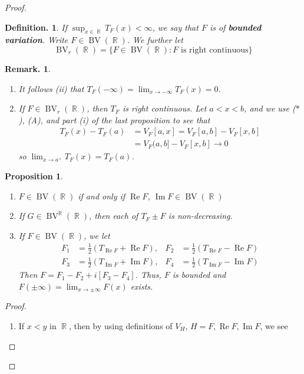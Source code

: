 \documentclass[12pt, a4paper]{memoir}
\DeclareMathOperator{\R}{{\mathbb{R}}}
\newtheorem{proposition}[theorem]{Proposition}
\theoremstyle{nonumberplain}
\newtheorem{definition}{Definition.}
\newtheorem{remark}{Remark.}
\newtheorem{proof}{Proof}
\renewcommand{\Re}{\ensuremath{\operatorname{Re}}}
\renewcommand{\Im}{\ensuremath{\operatorname{Im}}}
\DeclareMathOperator{\BV}{BV}
\begin{document}
\begin{proof}
\begin{definition}
    If $\sup_{x\in\R}T_F(x)<\infty$, we say that $F$ is of \textbf{bounded variation}.
    Write $F\in\BV(\R)$.
    We further let
    \begin{equation*}
        \BV_r(\R)=\{F\in \BV(\R):F\text{ is right continuous}\}
    \end{equation*}
\end{definition}
\begin{remark}
    \begin{enumerate}[nl,r]
        \item It follows (ii) that $T_F(-\infty)=\lim_{x\to -\infty}T_F(x)=0$.
        \item If $F\in \BV_r(\R)$, then $T_F$ is right continuous.
            Let $a<x<b$, and we use ($*$), (A), and part (i) of the last proposition to see that
            \begin{align*}
                T_F(x)-T_F(a) &= V_F[a,x]=V_F[a,b]-V_F[x,b]\\
                              &= V_F(a,b]-V_F[x,b]\to 0
            \end{align*}
            so $\lim_{x\to a^+}T_F(x)=T_F(a)$.
    \end{enumerate}
\end{remark}
\begin{proposition}
    \begin{enumerate}[nl,r]
        \item $F\in\BV(\R)$ if and only if $\Re F$, $\Im F\in\BV(\R)$
        \item If $G\in\BV^{\R}(\R)$, then each of $T_F\pm F$ is non-decreasing.
        \item If $F\in\BV(\R)$, we let
            \begin{align*}
                F_1 &= \frac{1}{2}\left(T_{\Re F}+ \Re F\right), & F_2&=\frac{1}{2}\left(T_{\Re F}-\Re F\right)\\
                F_3 &= \frac{1}{2}\left(T_{\Im F}+ \Im F\right), & F_4&=\frac{1}{2}\left(T_{\Im F}-\Im F\right)
            \end{align*}
            Then $F=F_1-F_2+i[F_3-F_4]$.
            Thus, $F$ is bounded and $F(\pm\infty)=\lim_{x\to \pm\infty}F(x)$ exists.
    \end{enumerate}
\end{proposition}
\begin{proof}
    \begin{enumerate}[r]
        \item If $x<y$ in $\R$, then by using definitions of $V_H$, $H=F,\Re F,\Im F$, we see

\end{enumerate}
\end{proof}
\end{proof}
\end{document}
